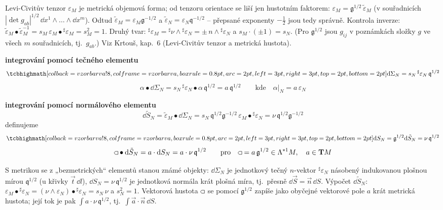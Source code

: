 \begin{vysvetleni}
Levi-Civitův tenzor $\varepsilon_M$ je metrická objemová forma; od tenzoru orientace se liší jen hustotním faktorem: $\varepsilon_M=\mathfrak g^{1/2}\,\tilde\varepsilon_M$ (v souřadnicích $|\det g_{ab}|^{1/2}\,\dd x^1\wedge\ldots\wedge\dd x^m$). Odtud $\tilde\varepsilon_M=\varepsilon_M\mathfrak g^{-1/2}$ a $\tilde\varepsilon_N=\varepsilon_N\mathfrak q^{-1/2}$ -- přepsané exponenty $-\tfrac12$ jsou tedy správně. Kontrola inverze: $\tilde\varepsilon_M\bullet\tilde\varepsilon_M^{-1}=s_M\,\varepsilon_M\bullet{}^\sharp\varepsilon_M=s_M^2=1$. Druhý tvar: ${}^\sharp\varepsilon_M={}^\sharp\nu\wedge{}^\sharp\varepsilon_N=\pm\,n\wedge{}^\sharp\varepsilon_N$ a $s_M\cdot(\pm1)=s_N$. (Pro $\mathfrak g^{1/2}$ jsou $g_{ij}$ v poznámkách složky $g$ ve všech $m$ souřadnicích, tj.\ $g_{ab}$.) Viz Krtouš, kap.~6 (Levi-Civitův tenzor a metrická hustota).
\end{vysvetleni}

\textbf{integrování pomocí tečného elementu}
\[
  \vzorec{\dd\Sigma_N = s_N\,{}^\sharp\varepsilon_N\,\mathfrak{q}^{1/2}}
\]
\[
  \alpha\bullet\dd\Sigma_N = s_N\,{}^\sharp\varepsilon_N\bullet\alpha\,\mathfrak{q}^{1/2} = a\,\mathfrak{q}^{1/2}
  \qquad\text{kde}\quad \alpha|_N = a\,\varepsilon_N
\]

\textbf{integrování pomocí normálového elementu}
\[
  \dd\tilde S_N = \tilde\varepsilon_M\bullet\dd\Sigma_N = s_N\,\mathfrak{q}^{1/2}\mathfrak{g}^{-1/2}\,\varepsilon_M\bullet{}^\sharp\varepsilon_N
  = \nu\,\mathfrak{q}^{1/2}\mathfrak{g}^{-1/2}
\]
definujeme
\[
  \vzorec{\dd S_N = \mathfrak{g}^{1/2}\dd\tilde S_N = \nu\,\mathfrak{q}^{1/2}}
\]
\[
  \gmIpatnactHust\bullet\dd\tilde S_N = a\cdot\dd S_N = a\cdot\nu\,\mathfrak{q}^{1/2}
  \qquad\text{pro}\quad \gmIpatnactHust = a\,\mathfrak{g}^{1/2}\in\Lambda^{*1}M, \quad a\in\mathbf{T}M
\]

\begin{vysvetleni}
S metrikou se z „bezmetrických“ elementů stanou známé objekty: $\dd\Sigma_N$ je jednotkový tečný $n$-vektor ${}^\sharp\varepsilon_N$ násobený indukovanou plošnou mírou $\mathfrak q^{1/2}$ (u křivky $\vec t\,\dd l$), $\dd S_N=\nu\,\mathfrak q^{1/2}$ je jednotková normála krát plošná míra, tj.\ přesně $\dd\vec S=\vec n\,\dd S$. Výpočet $\dd\tilde S_N$: $\varepsilon_M\bullet{}^\sharp\varepsilon_N=(\nu\wedge\varepsilon_N)\bullet{}^\sharp\varepsilon_N=s_N\,\nu$ a $s_N^2=1$. Vektorová hustota $\gmIpatnactHust$ se pomocí $\mathfrak g^{1/2}$ zapíše jako obyčejné vektorové pole $a$ krát metrická hustota; její tok je pak $\int a\cdot\nu\,\mathfrak q^{1/2}$, tj.\ $\int\vec a\cdot\vec n\,\dd S$.
\end{vysvetleni}


